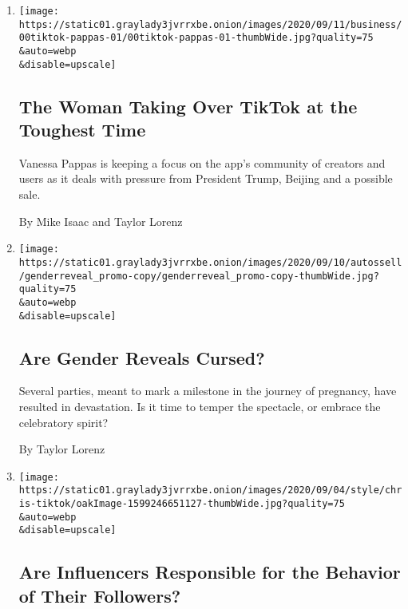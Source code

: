 \begin{enumerate}
\def\labelenumi{\arabic{enumi}.}
\item
  \href{/2020/09/11/technology/tiktok-vanessa-pappas-bytedance.html}{}

  \texttt{[image: https://static01.graylady3jvrrxbe.onion/images/2020/09/11/business/00tiktok-pappas-01/00tiktok-pappas-01-thumbWide.jpg?quality=75\\\&auto=webp\\\&disable=upscale]}

  \hypertarget{the-woman-taking-over-tiktok-at-the-toughest-time}{%
  \subsection{The Woman Taking Over TikTok at the Toughest
  Time}\label{the-woman-taking-over-tiktok-at-the-toughest-time}}

  Vanessa Pappas is keeping a focus on the app's community of creators
  and users as it deals with pressure from President Trump, Beijing and
  a possible sale.

  By Mike Isaac and Taylor Lorenz
\item
  \href{/2020/09/10/style/gender-reveal-parties-cursed.html}{}

  \texttt{[image: https://static01.graylady3jvrrxbe.onion/images/2020/09/10/autossell/genderreveal\_promo-copy/genderreveal\_promo-copy-thumbWide.jpg?quality=75\\\&auto=webp\\\&disable=upscale]}

  \hypertarget{are-gender-reveals-cursed}{%
  \subsection{Are Gender Reveals
  Cursed?}\label{are-gender-reveals-cursed}}

  Several parties, meant to mark a milestone in the journey of
  pregnancy, have resulted in devastation. Is it time to temper the
  spectacle, or embrace the celebratory spirit?

  By Taylor Lorenz
\item
  \href{/2020/09/04/style/tiktok-lgbt-harassment-donelij.html}{}

  \texttt{[image: https://static01.graylady3jvrrxbe.onion/images/2020/09/04/style/chris-tiktok/oakImage-1599246651127-thumbWide.jpg?quality=75\\\&auto=webp\\\&disable=upscale]}

  \hypertarget{are-influencers-responsible-for-the-behavior-of-their-followers}{%
  \subsection{Are Influencers Responsible for the Behavior of Their
  Followers?}\label{are-influencers-responsible-for-the-behavior-of-their-followers}}


\end{enumerate}

